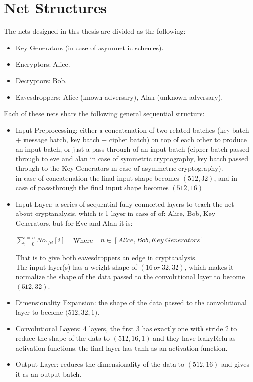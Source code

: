 \documentclass[a4paper, 12pt]{report}
\begin{document}
\section{\textbf{Net Structures}}
The nets designed in this thesis are divided as the following:
\begin{itemize}
	\item Key Generators (in case of asymmetric schemes).
	\item Encryptors: Alice.
	\item Decryptors: Bob.
	\item Eavesdroppers: Alice (known adversary), Alan (unknown adversary).
\end{itemize}
Each of these nets share the following general sequential structure:
\begin{itemize}
	\item Input Preprocessing: either a concatenation of two related batches (key batch + message batch, key batch + cipher batch) on top of each other to produce an input batch, or just a pass through of an input batch (cipher batch passed through to eve and alan in case of symmetric cryptography, key batch passed through to the Key Generators in case of asymmetric cryptography).\\
	in case of concatenation the final input shape becomes $ (512, 32) $, and in case of pass-through the final input shape becomes $ (512, 16) $
	\item Input Layer: a series of sequential fully connected layers to teach the net about cryptanalysis, which is 1 layer in case of of: Alice, Bob, Key Generators, but for Eve and Alan it is: 
	\begin{center}
		$ \sum_{i = 0}^{i=n} No._{fcl}[i] $ ~ Where ~
		$ n \in [Alice, Bob, Key ~ Generators] $
	\end{center}
	That is to give both eavesdroppers an edge in cryptanalysis.\\
	The input layer(s) has a weight shape of $ (16 ~ or ~ 32, 32) $, which makes it normalize the shape of the data passed to the convolutional layer to become $ (512, 32) $.
	\item Dimensionality Expansion:  the shape of the data passed to the convolutional layer to become $ (512, 32, 1 $).
	\item Convolutional Layers: 4 layers, the first 3 has exactly one with stride 2 to reduce the shape of the data to $ (512, 16, 1) $ and they have leakyRelu as activation functions, the final layer has tanh as an activation function.
	\item Output Layer: reduces the dimensionality of the data to $ (512, 16) $ and gives it as an output batch. 
\end{itemize}
\end{document}

